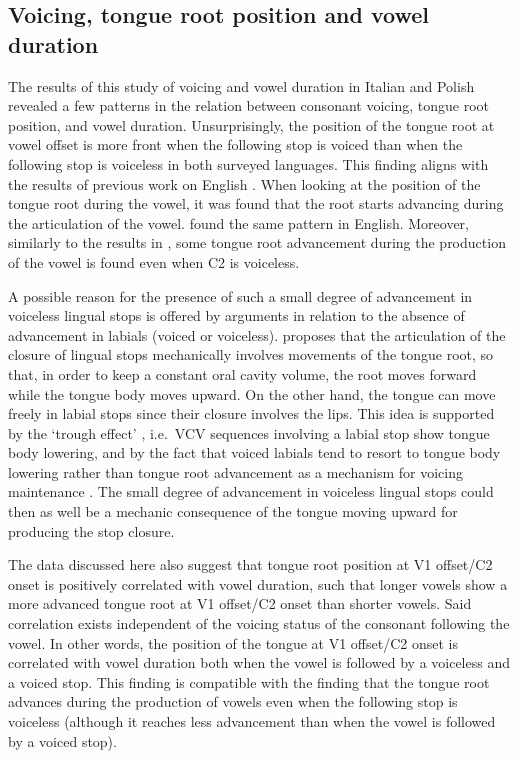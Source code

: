 \documentclass[preprint]{JASAnew}
\begin{document}
\label{s:discussion}

\hypertarget{voicing-tongue-root-position-and-vowel-duration}{%
\subsection{Voicing, tongue root position and vowel
duration}\label{voicing-tongue-root-position-and-vowel-duration}}

The results of this study of voicing and vowel duration in Italian and
Polish revealed a few patterns in the relation between consonant
voicing, tongue root position, and vowel duration. Unsurprisingly, the
position of the tongue root at vowel offset is more front when the
following stop is voiced than when the following stop is voiceless in
both surveyed languages. This finding aligns with the results of
previous work on English
\citep{kent1969, perkell1969, westbury1983, ahn2018}. When looking at
the position of the tongue root during the vowel, it was found that the
root starts advancing during the articulation of the vowel.
\citet{westbury1983} found the same pattern in English. Moreover,
similarly to the results in \citet{westbury1983}, some tongue root
advancement during the production of the vowel is found even when C2 is
voiceless.

A possible reason for the presence of such a small degree of advancement
in voiceless lingual stops is offered by arguments in relation to the
absence of advancement in labials (voiced or voiceless).
\citet{westbury1983} proposes that the articulation of the closure of
lingual stops mechanically involves movements of the tongue root, so
that, in order to keep a constant oral cavity volume, the root moves
forward while the tongue body moves upward. On the other hand, the
tongue can move freely in labial stops since their closure involves the
lips. This idea is supported by the `trough effect'
\citep{vazquez-alvarez2007}, i.e.~VCV sequences involving a labial stop
show tongue body lowering, and by the fact that voiced labials tend to
resort to tongue body lowering rather than tongue root advancement as a
mechanism for voicing maintenance
\citep{perkell1969, westbury1983, ahn2018}. The small degree of
advancement in voiceless lingual stops could then as well be a mechanic
consequence of the tongue moving upward for producing the stop closure.

The data discussed here also suggest that tongue root position at V1
offset/C2 onset is positively correlated with vowel duration, such that
longer vowels show a more advanced tongue root at V1 offset/C2 onset
than shorter vowels. Said correlation exists independent of the voicing
status of the consonant following the vowel. In other words, the
position of the tongue at V1 offset/C2 onset is correlated with vowel
duration both when the vowel is followed by a voiceless and a voiced
stop. This finding is compatible with the finding that the tongue root
advances during the production of vowels even when the following stop is
voiceless (although it reaches less advancement than when the vowel is
followed by a voiced stop).
\end{document}
